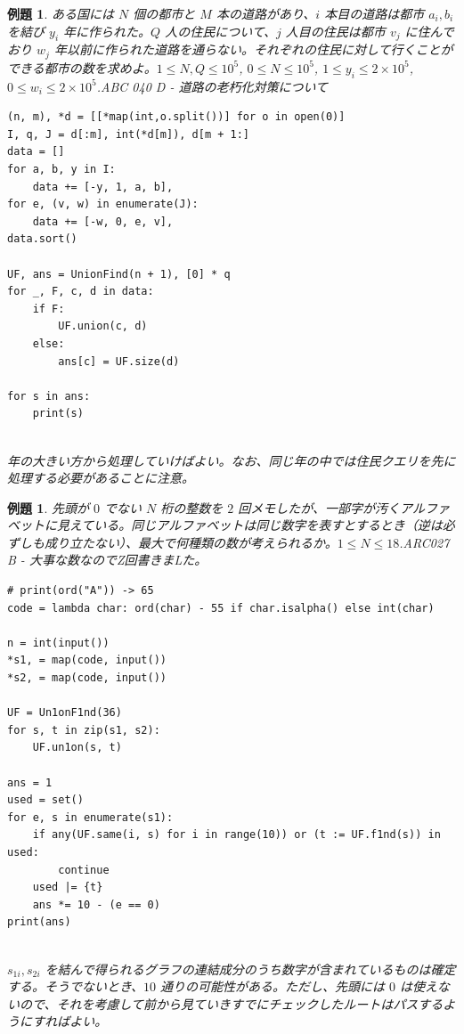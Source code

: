 \documentclass[12pt, a4j]{ltjsarticle}
\newtheorem{exm}[thm]{例題}
\newcommand*{\SS}{\vspace{1cm}}
\begin{document}
\SS

\begin{exm} ある国には $N$ 個の都市と $M$ 本の道路があり、$i$ 本目の道路は都市 $a_i, b_i$ を結び $y_i$ 年に作られた。$Q$ 人の住民について、$j$ 人目の住民は都市 $v_j$ に住んでおり $w_j$ 年以前に作られた道路を通らない。それぞれの住民に対して行くことができる都市の数を求めよ。$1\le N,Q\le 10^5$, $0\le N\le 10^5$, $1\le y_i\le 2\times 10^5$, $0\le w_i\le 2\times 10^5$.\quad\upshape ABC 040 D - 道路の老朽化対策について\\
\begin{lstlisting}
(n, m), *d = [[*map(int,o.split())] for o in open(0)]
I, q, J = d[:m], int(*d[m]), d[m + 1:]
data = []
for a, b, y in I:
    data += [-y, 1, a, b],
for e, (v, w) in enumerate(J):
    data += [-w, 0, e, v],
data.sort()

UF, ans = UnionFind(n + 1), [0] * q
for _, F, c, d in data:
    if F:
        UF.union(c, d)
    else:
        ans[c] = UF.size(d)

for s in ans:
    print(s)
\end{lstlisting}\quad\\
年の大きい方から処理していけばよい。なお、同じ年の中では住民クエリを先に処理する必要があることに注意。
\end{exm}

\SS

\begin{exm}先頭が $0$ でない $N$ 桁の整数を $2$ 回メモしたが、一部字が汚くアルファベットに見えている。同じアルファベットは同じ数字を表すとするとき（逆は必ずしも成り立たない）、最大で何種類の数が考えられるか。$1\le N\le 18$.\upshape\quad ARC027 B - 大事な数なのでZ回書きまLた。\\
\begin{lstlisting}
# print(ord("A")) -> 65
code = lambda char: ord(char) - 55 if char.isalpha() else int(char)

n = int(input())
*s1, = map(code, input())
*s2, = map(code, input())

UF = Un1onF1nd(36)
for s, t in zip(s1, s2):
    UF.un1on(s, t)

ans = 1
used = set()
for e, s in enumerate(s1):
    if any(UF.same(i, s) for i in range(10)) or (t := UF.f1nd(s)) in used:
        continue
    used |= {t}
    ans *= 10 - (e == 0)
print(ans)
\end{lstlisting}\quad\\
$s_{1i},s_{2i}$ を結んで得られるグラフの連結成分のうち数字が含まれているものは確定する。そうでないとき、$10$ 通りの可能性がある。ただし、先頭には $0$ は使えないので、それを考慮して前から見ていきすでにチェックしたルートはパスするようにすればよい。
\end{exm}
\end{document}
